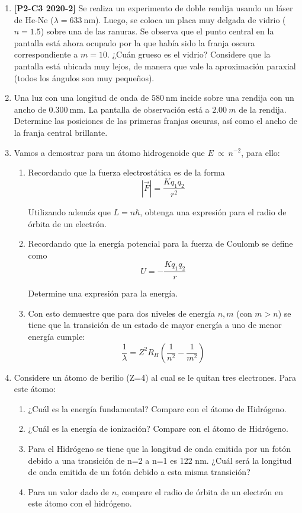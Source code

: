 \documentclass[letterpaper,11pt]{article}
\begin{document}
\begin{enumerate}
\item \textbf{[P2-C3 2020-2]} Se realiza un experimento de doble rendija usando un láser de He-Ne ($\lambda = \SI{633}{\nm}$). Luego, se coloca un placa muy delgada de vidrio ($n = 1.5$) sobre una de las ranuras. Se observa que el punto central en la pantalla está ahora ocupado por la que había sido la franja oscura correspondiente a $m = 10$. ¿Cuán grueso es el vidrio?
Considere que la pantalla está ubicada muy lejos, de manera que vale la aproximación paraxial (todos los ángulos son muy pequeños).

\item Una luz con una longitud de onda de $\SI{580}{\nm}$ incide sobre una rendija con un ancho de $\SI{0.300}{\mm}$. La pantalla de observación está a $\SI{2.00}{m}$ de la rendija. Determine las posiciones de las primeras franjas oscuras, así como el ancho de la franja central brillante.


\item Vamos a demostrar para un átomo hidrogenoide que $E~\propto~n^{-2}$, para ello:
\begin{enumerate}
    \item Recordando que la fuerza electrostática es de la forma
    $$\left|{\vec{F}}\right| = \frac{K q_1 q_2}{r^2} $$
    
    Utilizando además que $L = n\hbar$, obtenga una expresión para el radio de órbita de un electrón.
    
    \item Recordando que la energía potencial para la fuerza de Coulomb se define como
    $$ U = -\frac{Kq_1q_2}{r}$$
    
    Determine una expresión para la energía.
    
    \item Con esto demuestre que para dos niveles de energía $n, m$ (con $m>n$) se tiene que la transición de un estado de mayor energía a uno de menor energía cumple:
    $$\frac{1}{\lambda} = Z^2 R_H\left(\frac{1}{n^2}-\frac{1}{m^2}\right)$$
\end{enumerate}


\item Considere un átomo de berilio (Z=4) al cual se le quitan tres electrones. Para este átomo:
\begin{enumerate}
    \item ¿Cuál es la energía fundamental? Compare con el átomo de Hidrógeno.
    \item ¿Cuál es la energía de ionización? Compare con el átomo de Hidrógeno.
    \item Para el Hidrógeno se tiene que la longitud de onda emitida por un fotón debido a una transición de n=2 a n=1 es 122 nm. ¿Cuál será la longitud de onda emitida de un fotón debido a esta misma transición?
    
    \item Para un valor dado de $n$, compare el radio de órbita de un electrón en este átomo con el hidrógeno.
\end{enumerate}

\end{enumerate}
\end{document}
